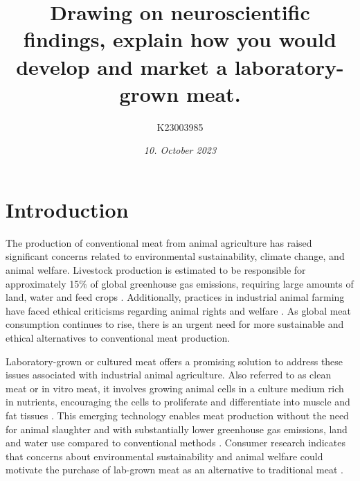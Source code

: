 \documentclass[10pt]{article}
\title{Drawing on neuroscientific findings, explain how you would develop and market a laboratory-grown meat.}
\author[ ]{K23003985}
\date{\textit{10. October 2023}}
\begin{document}

\maketitle


\begin{sloppypar} %





  \section{Introduction}
  \label{sec:introduction}

  The production of conventional meat from animal agriculture has raised significant concerns related to environmental sustainability, climate change, and animal welfare. Livestock production is estimated to be responsible for approximately 15\% of global greenhouse gas emissions, requiring large amounts of land, water and feed crops \citep{tuomisto_environmental_2011}. Additionally, practices in industrial animal farming have faced ethical criticisms regarding animal rights and welfare \citep{stephens_bringing_2018}. As global meat consumption continues to rise, there is an urgent need for more sustainable and ethical alternatives to conventional meat production.

  Laboratory-grown or cultured meat offers a promising solution to address these issues associated with industrial animal agriculture. Also referred to as clean meat or in vitro meat, it involves growing animal cells in a culture medium rich in nutrients, encouraging the cells to proliferate and differentiate into muscle and fat tissues \citep{datar_possibilities_2010}. This emerging technology enables meat production without the need for animal slaughter and with substantially lower greenhouse gas emissions, land and water use compared to conventional methods \citep{tuomisto_environmental_2011}. Consumer research indicates that concerns about environmental sustainability and animal welfare could motivate the purchase of lab-grown meat as an alternative to traditional meat \citep{circus_exploring_2018}.


\end{sloppypar}
\end{document}
